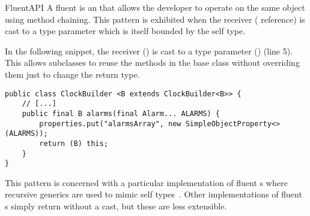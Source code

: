\begin{pattern}{FluentAPI}
A fluent \api{} is an \api{} that allows the developer to operate on the same
object using method chaining.
This pattern is exhibited when the receiver ( reference) is cast to a type parameter
  which is itself bounded by the self type.


\instances{}
In the following snippet,%
\def\urlvar{http://bit.ly/HanSolo_Medusa_2TyBObH}
the receiver () is cast to a type parameter () (line 5).
This allows subclasses to reuse the methods in the base class without overriding them just to change the return type.

\begin{verbatim}
public class ClockBuilder <B extends ClockBuilder<B>> {
    // [...]
    public final B alarms(final Alarm... ALARMS) {
        properties.put("alarmsArray", new SimpleObjectProperty<>(ALARMS));
        return (B) this;
    }
}
\end{verbatim}

\discussion{}
  This pattern is concerned with a particular implementation of fluent \api{}s
  where recursive generics are used to mimic self
  types~\cite{bruceChallengingTypingIssues2003}.
  Other implementations of fluent \api{}s simply return  without a
  cast, but these are less extensible.

\end{pattern}

